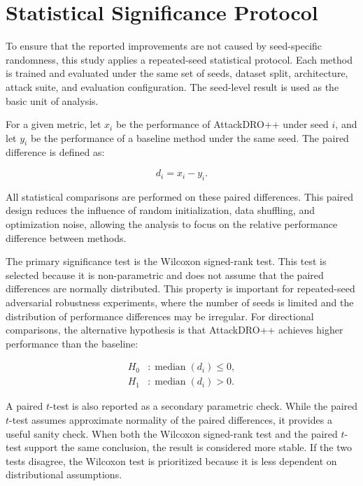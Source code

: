 ﻿\section{Statistical Significance Protocol}
\label{sec:ch5_statistical_protocol}

To ensure that the reported improvements are not caused by seed-specific randomness, this study applies a repeated-seed statistical protocol. Each method is trained and evaluated under the same set of seeds, dataset split, architecture, attack suite, and evaluation configuration. The seed-level result is used as the basic unit of analysis.

For a given metric, let $x_i$ be the performance of AttackDRO++ under seed $i$, and let $y_i$ be the performance of a baseline method under the same seed. The paired difference is defined as:

\begin{equation}
    d_i = x_i - y_i.
\end{equation}

All statistical comparisons are performed on these paired differences. This paired design reduces the influence of random initialization, data shuffling, and optimization noise, allowing the analysis to focus on the relative performance difference between methods.

The primary significance test is the Wilcoxon signed-rank test. This test is selected because it is non-parametric and does not assume that the paired differences are normally distributed. This property is important for repeated-seed adversarial robustness experiments, where the number of seeds is limited and the distribution of performance differences may be irregular. For directional comparisons, the alternative hypothesis is that AttackDRO++ achieves higher performance than the baseline:

\begin{align}
    H_0 &: \operatorname{median}(d_i) \leq 0, \\
    H_1 &: \operatorname{median}(d_i) > 0.
\end{align}

A paired $t$-test is also reported as a secondary parametric check. While the paired $t$-test assumes approximate normality of the paired differences, it provides a useful sanity check. When both the Wilcoxon signed-rank test and the paired $t$-test support the same conclusion, the result is considered more stable. If the two tests disagree, the Wilcoxon test is prioritized because it is less dependent on distributional assumptions.

